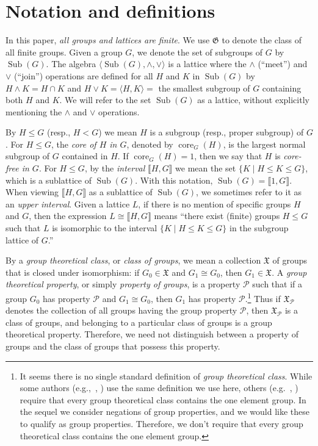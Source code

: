 \documentclass{gen-j-l}
\newcommand{\lb}{\ensuremath{\llbracket}}
\newcommand{\rb}{\ensuremath{\rrbracket}}
\newcommand{\<}{\ensuremath{\langle}}
\renewcommand{\>}{\ensuremath{\rangle}}
\theoremstyle{plain}
\theoremstyle{definition}
\theoremstyle{remark}
\numberwithin{theorem}{section}
\numberwithin{claim}{section}
\numberwithin{equation}{section}
\numberwithin{conjecture}{section}
\newcommand{\defn}[1]{\emph{#1}}
\renewcommand{\leq}{\ensuremath{\leqslant}}
\newcommand{\meet}{\ensuremath{\wedge}}
\newcommand{\join}{\ensuremath{\vee}}
\newcommand{\Sub}{\ensuremath{\operatorname{Sub}}}
\newcommand{\core}{\ensuremath{\operatorname{core}}}
\newcommand{\2}{\ensuremath{\mathbf{2}}}
\newcommand{\3}{\ensuremath{\mathbf{3}}}
\newcommand{\sG}{\ensuremath{\mathfrak{X}}}
\newcommand{\G}{\ensuremath{\mathfrak{G}}}
\newcommand{\cP}{\ensuremath{\mathcal{P}}}
\begin{document}
\section{Notation and definitions}
\label{sec:notation-definitions}
In this paper, \emph{all groups and lattices are finite}.  We use 
$\G$ to denote the class of all finite groups.
Given a group $G$, we denote the set of subgroups of $G$ by $\Sub(G)$.  The
algebra $\<\Sub(G), \meet, \join\>$ is a lattice where the $\meet$ (``meet'') and
$\join$ (``join'') operations are defined for all $H$ and $K$ in $\Sub(G)$ by
$H\meet K = H\cap K$ and $H\join K = \<H, K\> = $ the smallest subgroup of $G$
containing both $H$ and $K$.  We will refer to the set
$\Sub(G)$ as a lattice, without explicitly mentioning the $\meet$ and
$\join$ operations.

By $H \leq G$ (resp.,
$H < G$) we mean $H$ is a subgroup (resp., proper subgroup) of $G$.
For $H\leq G$, the
\emph{core of $H$ in $G$}, denoted by $\core_G(H)$, is the largest normal subgroup of $G$
contained in $H$.
If $\core_G(H)=1$, then we say that $H$ is \emph{core-free in $G$}.
For $H\leq G$,
by the \defn{interval} $\lb H, G \rb$ we mean 
the set $\{K \mid H\leq K \leq G\}$, which is a
sublattice of $\Sub(G)$.
With this notation, $\Sub(G)=\lb 1,G \rb$.
When viewing $\lb H,G \rb$ as a
sublattice of $\Sub(G)$, we sometimes refer to it as an \defn{upper interval}. 
Given a lattice $L$, if there is no mention of specific groups $H$ and
$G$, then the expression $L \cong \lb H, G \rb$ means ``there exist (finite) groups $H
\leq G$ such that $L$ is isomorphic to the interval $\{K \mid H\leq K \leq G\}$ in
the subgroup lattice of $G$.''  

By a \defn{group theoretical class}, or \defn{class of groups}, we mean a
collection $\sG$ of groups that is closed under isomorphism:
if $G_0\in \sG$ and  $G_1\cong G_0$, then $G_1\in \sG$.
A \defn{group theoretical property}, or simply \defn{property of groups},
is a property $\cP$ such that if a group $G_0$ has property $\cP$ and
$G_1\cong G_0$, then $G_1$ has property $\cP$.\footnote{It seems there
  is no single standard definition of \emph{group theoretical class}.
  While some authors (e.g.,~\cite{Doerk:1992}, \cite{BBE:2006}) use the same
  definition we use here, others (e.g.~\cite{Robinson:1996}, \cite{Rose:1978})
  require that every group theoretical class contains the one element group. 
  In the sequel we consider negations of group properties, and we would
  like these to qualify as group properties.  Therefore, we don't require
  that every group theoretical class contains the one element group.}   
Thus if $\sG_{\cP}$ denotes the collection of all groups having the group
property $\cP$, then  $\sG_{\cP}$  is a class of groups, and belonging to a
particular class of groups is a group theoretical property.  Therefore, we need not
distinguish between a property of groups and the class of groups that possess
this property.
\end{document}
